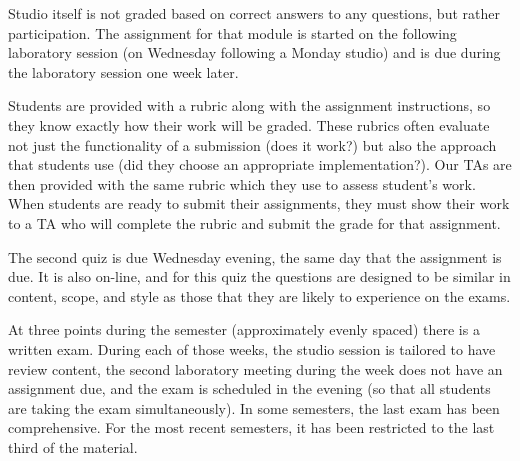 Studio itself is not graded based on correct answers to any questions, but
rather participation. The assignment for that module is started on the
following laboratory session (on Wednesday following a Monday studio)
and is due during the laboratory session one week later.

Students are provided with a rubric along with the assignment instructions,
so they know exactly how their work will be graded. These rubrics often evaluate
not just the functionality of a submission (does it work?) but also the approach
that students use (did they choose an appropriate implementation?). Our TAs are then
provided with the same rubric which they use to assess student's work. When
students are ready to submit their assignments, they must show their work
to a TA who will complete the rubric and submit the grade for that assignment.

The second quiz is due Wednesday evening, the same day that the assignment
is due. It is also on-line, and for this quiz the questions are designed
to be similar in content, scope, and style as those that they are likely to
experience on the exams.

At three points during the semester (approximately evenly spaced) there
is a written exam.  During each of those weeks, the
studio session is tailored to have review content, the second laboratory
meeting during the week does not have an assignment due, and the
exam is scheduled in the evening (so that all students are taking the
exam simultaneously).
In some semesters, the last exam has been comprehensive.  For the most
recent semesters, it has been restricted to the last third of the material.
